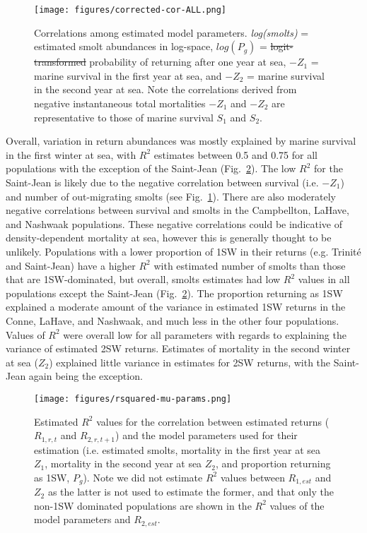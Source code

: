 \documentclass[12pt]{article}
\newcommand{\Pg}{$P_g$\xspace}
\providecommand{\DIFaddtex}[1]{{\protect\color{blue}\uwave{#1}}} %
\providecommand{\DIFdeltex}[1]{{\protect\color{red}\sout{#1}}}                      %
\providecommand{\DIFaddFL}[1]{\DIFadd{#1}} %
\providecommand{\DIFdelFL}[1]{\DIFdel{#1}} %
\providecommand{\DIFaddbeginFL}{} %
\providecommand{\DIFaddendFL}{} %
\providecommand{\DIFdelbeginFL}{} %
\providecommand{\DIFdelendFL}{} %
\providecommand{\DIFadd}[1]{\texorpdfstring{\DIFaddtex{#1}}{#1}} %
\providecommand{\DIFdel}[1]{\texorpdfstring{\DIFdeltex{#1}}{}} %
\begin{document}
\begin{figure}[htbp] \centering
    \texttt{[image: figures/corrected-cor-ALL.png]}
    \caption{Correlations among estimated model parameters. \emph{log(smolts)} = estimated smolt abundances in log-space, $log(P_g)$ = \DIFdelbeginFL \DIFdelFL{logit-transformed }\DIFdelendFL \DIFaddbeginFL \DIFaddFL{probit-transformed }\DIFaddendFL probability of
        returning after one year at sea, $-Z_1$ = marine survival in the first year at sea, and $-Z_2$ = marine survival in the second year at sea.
        Note the correlations derived from negative instantaneous total mortalities $-Z_1$ and $-Z_2$ are representative to those of marine survival $S_1$ and $S_2$.}
    \label{fig:cor-params}
\end{figure}
Overall, variation in return abundances was mostly explained by marine survival in the
first winter at sea, with $R^2$ estimates between 0.5 and 0.75 for all populations
with the exception of the Saint-Jean (Fig.~\ref{fig:mu-rsq}).
The low $R^2$ for the Saint-Jean is likely due to the negative correlation
between survival (i.e. $-Z_1$) and number of out-migrating smolts (see Fig.~\ref{fig:cor-params}).
There are also moderately negative correlations between survival and smolts in
the Campbellton, LaHave, and Nashwaak populations.
These negative correlations could be indicative of density-dependent
mortality at sea, however this is generally thought to be unlikely.
Populations with a lower proportion of 1SW in their returns (e.g. Trinit\'{e}
and Saint-Jean) have a higher $R^2$ with estimated number of smolts than those
that are 1SW-dominated, but overall, smolts estimates had low $R^2$ values in
all populations except the Saint-Jean (Fig.~\ref{fig:mu-rsq}).
The proportion returning as 1SW explained a moderate amount of the variance in
estimated 1SW returns in the Conne, LaHave, and Nashwaak, and much less in the
other four populations.
Values of $R^2$ were overall low for all parameters with regards to explaining
the variance of estimated 2SW returns. Estimates of mortality in the second winter at sea ($Z_2$)
explained little variance in estimates for 2SW returns, with the Saint-Jean again being the
exception.

\begin{figure}[htbp]
 \centering
    \texttt{[image: figures/rsquared-mu-params.png]}
    \caption{Estimated $R^2$ values for the correlation between estimated
        returns ($R_{1,r,t}$ and $R_{2,r,t+1}$) and the model parameters used
        for their estimation (i.e. estimated smolts, mortality in the first
        year at sea $Z_1$, mortality in the second year at sea $Z_2$, and
        proportion returning as 1SW, \Pg). Note we did not estimate $R^2$
        values between $R_{1,est}$ and $Z_2$ as the latter is not used to
        estimate the former, and that only the non-1SW dominated populations are
        shown in the $R^2$ values of the model parameters and $R_{2,est}$.}
    \label{fig:mu-rsq}

\end{figure}
\end{document}
